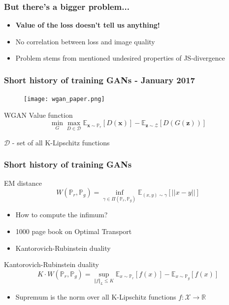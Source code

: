 \documentclass{Bredelebeamer}
\begin{document}
\begin{frame}
	\frametitle{But there's a bigger problem...}
	\begin{itemize}
		\item \textbf{Value of the loss doesn't tell us anything!}
		\item No correlation between loss and image quality
		\item Problem stems from mentioned undesired properties of JS-divergence
	\end{itemize}
\end{frame}

\begin{frame}
	\frametitle{Short history of training GANs - January 2017}
	\begin{figure}[h!]
		\centering
		\texttt{[image: wgan\_paper.png]}
	\end{figure}
	\begin{exampleblock}{WGAN Value function}
	\[
		\min_G \max_{D \in \mathcal{D}} \mathbb{E}_{\bm{x} \sim \mathbb{P}_r} \left[ D(\bm{x}) \right] - \mathbb{E}_{\bm{z} \sim \mathcal{Z}} \left[ D(G(\bm{z}))  \right]
	\]
	\begin{center}
		$\mathcal{D}$ - set of all K-Lipschitz functions
	\end{center}
	\end{exampleblock}
\end{frame}


\begin{frame}
	\frametitle{Short history of training GANs}
	\begin{exampleblock}{EM distance}
	\[
		W(\mathbb{P}_r, \mathbb{P}_g) = \inf_{\gamma \in \Pi(\mathbb{P}_r, \mathbb{P}_g)} {\mathbb{E}_{(x, y) \sim \gamma}} \left[ \lvert \lvert x - y \lvert \lvert \right]
	\]
	\end{exampleblock}
	\begin{itemize}[<+(1)->]
		\item How to compute the infimum?
		\item 1000 page book on Optimal Transport \footnotemark
		\item Kantorovich-Rubinstein duality
	\end{itemize}
	\pause
	\begin{exampleblock}{Kantorovich-Rubinstein duality}
	\[
		K \cdot W(\mathbb{P}_r, \mathbb{P}_g) = \sup_{\Vert f \Vert_L \leq K} \mathbb{E}_{x \sim \mathbb{P}_r} \left[ f(x) \right] - \mathbb{E}_{x \sim \mathbb{P}_g} \left[ f(x) \right]
	\]
	\end{exampleblock}
	\pause
	\begin{itemize}
		\item Supremum is the norm over all K-Lipschitz functions $f: \mathcal{X} \rightarrow \mathbb{R} $
	\end{itemize}
\end{frame}
\end{document}

